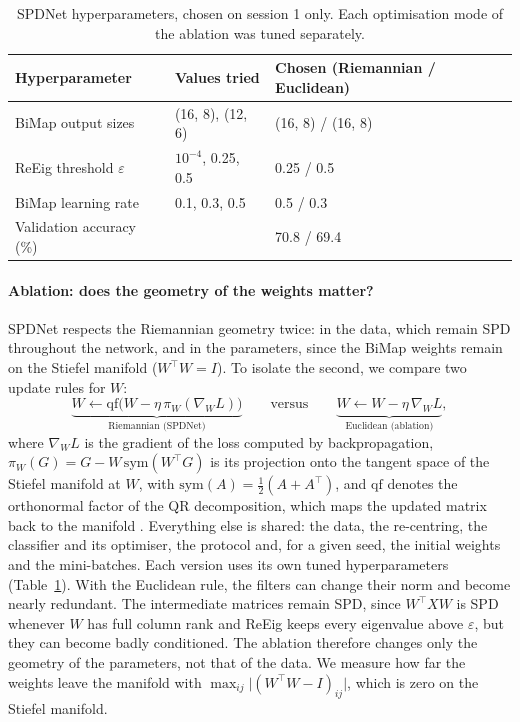 \begin{table}[htbp]
  \centering
  \caption{SPDNet hyperparameters, chosen on session 1 only. Each optimisation mode of the ablation was tuned separately.}
  \label{tab:spdnet_hparams}
  \begin{tabular}{lll}
    \toprule
    Hyperparameter & Values tried & Chosen (Riemannian / Euclidean) \\
    \midrule
    BiMap output sizes & (16, 8), (12, 6) & (16, 8) / (16, 8) \\
    ReEig threshold $\varepsilon$ & $10^{-4}$, 0.25, 0.5 & 0.25 / 0.5 \\
    BiMap learning rate & 0.1, 0.3, 0.5 & 0.5 / 0.3 \\
    \midrule
    Validation accuracy (\%) & & 70.8 / 69.4 \\
    \bottomrule
  \end{tabular}
\end{table}

\paragraph{Ablation: does the geometry of the weights matter?}
SPDNet respects the Riemannian geometry twice: in the data, which remain SPD throughout the network, and in the parameters, since the BiMap weights remain on the Stiefel manifold ($W^\top W = I$). To isolate the second, we compare two update rules for $W$:
\begin{equation}
  \underbrace{W \leftarrow \mathrm{qf}\big(W - \eta\, \pi_W(\nabla_W L)\big)}_{\text{Riemannian (SPDNet)}}
  \qquad \text{versus} \qquad
  \underbrace{W \leftarrow W - \eta\, \nabla_W L}_{\text{Euclidean (ablation)}},
  \label{eq:ablation}
\end{equation}
where $\nabla_W L$ is the gradient of the loss computed by backpropagation, $\pi_W(G) = G - W\,\mathrm{sym}(W^\top G)$ is its projection onto the tangent space of the Stiefel manifold at $W$, with $\mathrm{sym}(A) = \tfrac12(A + A^\top)$, and $\mathrm{qf}$ denotes the orthonormal factor of the QR decomposition, which maps the updated matrix back to the manifold \citep{absil2008}. Everything else is shared: the data, the re-centring, the classifier and its optimiser, the protocol and, for a given seed, the initial weights and the mini-batches. Each version uses its own tuned hyperparameters (Table~\ref{tab:spdnet_hparams}). With the Euclidean rule, the filters can change their norm and become nearly redundant. The intermediate matrices remain SPD, since $W^\top X W$ is SPD whenever $W$ has full column rank and ReEig keeps every eigenvalue above $\varepsilon$, but they can become badly conditioned. The ablation therefore changes only the geometry of the parameters, not that of the data. We measure how far the weights leave the manifold with $\max_{ij} \lvert (W^\top W - I)_{ij} \rvert$, which is zero on the Stiefel manifold.

